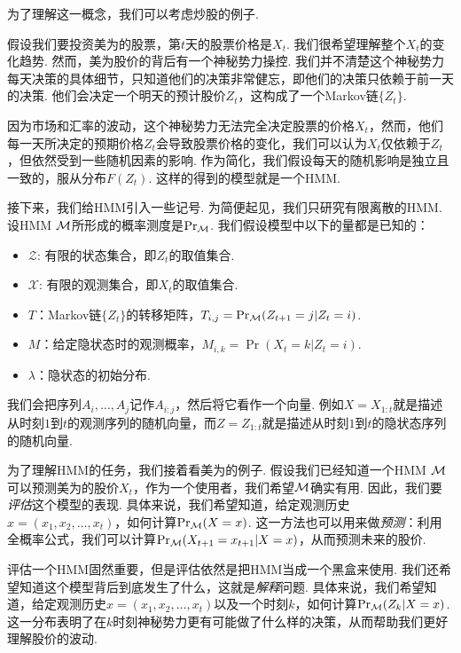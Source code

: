 为了理解这一概念，我们可以考虑炒股的例子. 
\begin{example}[美为HMM]\label{example:meiwei-HMM}
假设我们要投资美为的股票，第$t$天的股票价格是$X_t$. 我们很希望理解整个$X_t$的变化趋势. 然而，美为股价的背后有一个神秘势力操控. 我们并不清楚这个神秘势力每天决策的具体细节，只知道他们的决策非常健忘，即他们的决策只依赖于前一天的决策. 他们会决定一个明天的预计股价$Z_t$，这构成了一个Markov链$\{Z_t\}$. 

因为市场和汇率的波动，这个神秘势力无法完全决定股票的价格$X_t$，然而，他们每一天所决定的预期价格$Z_t$会导致股票价格的变化，我们可以认为$X_t$仅依赖于$Z_t$，但依然受到一些随机因素的影响. 作为简化，我们假设每天的随机影响是独立且一致的，服从分布$F(Z_t)$. 这样的得到的模型就是一个HMM.
\end{example}

接下来，我们给HMM引入一些记号. 为简便起见，我们只研究有限离散的HMM. 设HMM $\mathcal M$所形成的概率测度是$\Pr_\mathcal M$. 我们假设模型中以下的量都是已知的：
\begin{itemize}
    \item $\mathcal Z$: 有限的状态集合，即$Z_t$的取值集合.
    \item $\mathcal X$: 有限的观测集合，即$X_t$的取值集合.
    \item $T$：Markov链$\{Z_t\}$的转移矩阵，$T_{i,j}=\Pr_\mathcal M(Z_{t+1}=j|Z_t=i)$.
    \item $M$：给定隐状态时的观测概率，$M_{i,k} = \Pr(X_t=k|Z_t=i)$.
    \item $\lambda$：隐状态的初始分布.
\end{itemize}

我们会把序列$A_i,\dots, A_j$记作$A_{i:j}$，然后将它看作一个向量. 例如$X=X_{1:t}$就是描述从时刻$1$到$t$的观测序列的随机向量，而$Z=Z_{1:t}$就是描述从时刻$1$到$t$的隐状态序列的随机向量.

为了理解HMM的任务，我们接着看美为的例子. 假设我们已经知道一个HMM $\mathcal M$可以预测美为的股价$X_t$，作为一个使用者，我们希望$\mathcal M$确实有用. 因此，我们要\textit{评估}这个模型的表现. 具体来说，我们希望知道，给定观测历史$x=(x_1,x_2,\dots,x_t)$，如何计算$\Pr_\mathcal M(X=x)$. 这一方法也可以用来做\textit{预测}：利用全概率公式，我们可以计算$\Pr_\mathcal M(X_{t+1}=x_{t+1}|X=x)$，从而预测未来的股价.

评估一个HMM固然重要，但是评估依然是把HMM当成一个黑盒来使用. 我们还希望知道这个模型背后到底发生了什么，这就是\textit{解释}问题. 具体来说，我们希望知道，给定观测历史$x=(x_1,x_2,\dots,x_t)$以及一个时刻$k$，如何计算$\Pr_\mathcal M(Z_k|X=x)$. 这一分布表明了在$k$时刻神秘势力更有可能做了什么样的决策，从而帮助我们更好理解股价的波动.


